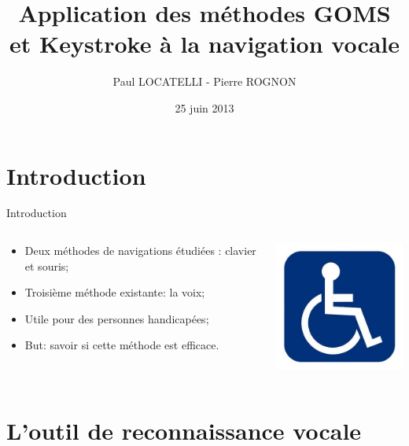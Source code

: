 \documentclass{beamer}
\title[Navigation vocale]{Application des méthodes GOMS et
Keystroke à la navigation vocale}
\author[]{Paul LOCATELLI - Pierre ROGNON}
\institute[UTBM]{Université de Technologies de Belfort-Montbéliard}
\date{25 juin 2013}
\begin{document}
\begin{frame}{}
	
	\maketitle	
	
\end{frame}

	\section*{Introduction}

\begin{frame}{Introduction}


	\begin{columns}[c]
	
	\begin{column}{5cm}
   		\begin{itemize}
			\item Deux méthodes de navigations étudiées : clavier et souris;
			\item Troisième méthode existante: la voix;
			\item Utile pour des personnes handicapées;
			\item But: savoir si cette méthode est efficace.
		\end{itemize}
  	\end{column}
	\begin{column}{5cm}
		\includegraphics[width=5cm]{gogol}
  	\end{column}
	
	\end{columns}
    	
\end{frame}

	\section{L'outil de reconnaissance vocale}
	
\end{document}
